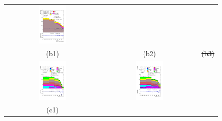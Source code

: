\documentclass[PAPER, coverpage, atlasdraft=true, texlive=2016, UKenglish]{\ATLASLATEXPATH atlasdoc}
\providecommand{\DIFadd}[1]{{\protect\color{blue}\uwave{#1}}} %
\providecommand{\DIFdel}[1]{{\protect\color{red}\sout{#1}}}                      %
\providecommand{\DIFaddFL}[1]{\DIFadd{#1}} %
\providecommand{\DIFdelFL}[1]{\DIFdel{#1}} %
\providecommand{\DIFaddbeginFL}{} %
\providecommand{\DIFaddendFL}{} %
\providecommand{\DIFdelbeginFL}{} %
\providecommand{\DIFdelendFL}{} %
\begin{document}
\begin{figure}[H]
\begin{tabular}{@{}ccc@{}}
\includegraphics[width=0.3\textwidth]{figures/tcH_reg1l1tau1b3j_os.pdf}&\DIFdelbeginFL %
\DIFdelendFL \\
\DIFaddbeginFL 

\DIFaddendFL %
(b1) & (b2)  &  \DIFdelbeginFL \DIFdelFL{(b3)  }\DIFdelendFL \\
\DIFaddbeginFL \includegraphics[width=0.3\textwidth]{figures/tcH_reg2mtau1b2jos.pdf}&
\DIFaddendFL \includegraphics[width=0.3\textwidth]{figures/tcH_reg2mtau1b3jos.pdf}&\\
(c1) \DIFaddbeginFL & \DIFaddFL{(c2)  }&  \DIFaddendFL \\
\end{tabular}

\end{figure}
\end{document}
